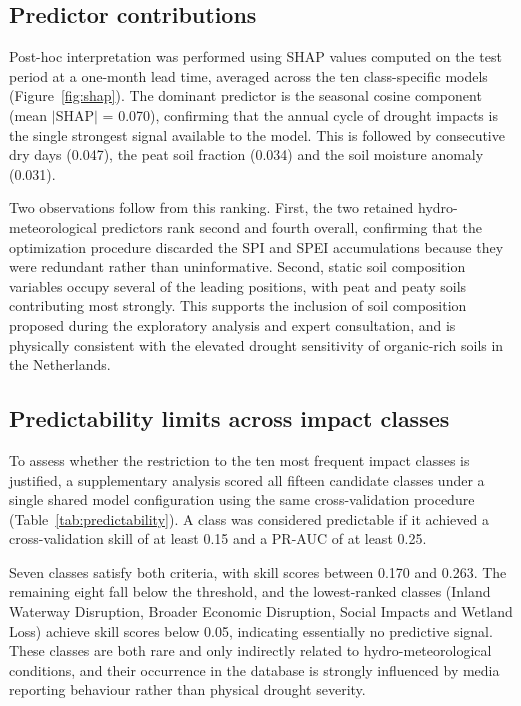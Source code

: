 \subsection{Predictor contributions}

Post-hoc interpretation was performed using SHAP values computed on the test
period at a one-month lead time, averaged across the ten class-specific models
(Figure~\ref{fig:shap}). The dominant predictor is the seasonal cosine
component (mean $|$SHAP$|$ = 0.070), confirming that the annual cycle of
drought impacts is the single strongest signal available to the model. This is
followed by consecutive dry days (0.047), the peat soil fraction (0.034) and
the soil moisture anomaly (0.031).

Two observations follow from this ranking. First, the two retained
hydro-meteorological predictors rank second and fourth overall, confirming
that the optimization procedure discarded the SPI and SPEI accumulations
because they were redundant rather than uninformative. Second, static soil
composition variables occupy several of the leading positions, with peat and
peaty soils contributing most strongly. This supports the inclusion of soil
composition proposed during the exploratory analysis and expert consultation,
and is physically consistent with the elevated drought sensitivity of
organic-rich soils in the Netherlands.

\subsection{Predictability limits across impact classes}

To assess whether the restriction to the ten most frequent impact classes is
justified, a supplementary analysis scored all fifteen candidate classes under
a single shared model configuration using the same cross-validation procedure
(Table~\ref{tab:predictability}). A class was considered predictable if it
achieved a cross-validation skill of at least 0.15 and a PR-AUC of at least
0.25.

Seven classes satisfy both criteria, with skill scores between 0.170 and 0.263.
The remaining eight fall below the threshold, and the lowest-ranked classes
(Inland Waterway Disruption, Broader Economic Disruption, Social Impacts and
Wetland Loss) achieve skill scores below 0.05, indicating essentially no
predictive signal. These classes are both rare and only indirectly related to
hydro-meteorological conditions, and their occurrence in the database is
strongly influenced by media reporting behaviour rather than physical drought
severity.

